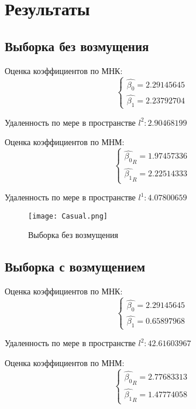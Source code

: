 \documentclass[12pt,a4paper]{article}
\begin{document}
\section {Результаты}
\subsection{Выборка без возмущения}
Оценка коэффициентов по МНК:
\begin{equation}
    \left\{
    \begin{array}{ll}
        \hat{\beta_0}=2.29145645\\
        \hat{\beta_1}=2.23792704
    \end{array}
    \right.
\end{equation}

Удаленность по мере в пространстве $l^2:2.90468199$

Оценка коэффициентов по МНМ:
\begin{equation}
    \left\{
    \begin{array}{ll}
        \hat{\beta_0}_R=1.97457336\\
        \hat{\beta_1}_R=2.22514333
    \end{array}
    \right.
\end{equation}

Удаленность по мере в пространстве $l^1:4.07800659$
\begin{figure}[H]
    \centering
    \texttt{[image: Casual.png]}
    \caption{Выборка без возмущения}
\end{figure}

\subsection{Выборка с возмущением}
Оценка коэффициентов по МНК:
\begin{equation}
    \left\{
    \begin{array}{ll}
        \hat{\beta_0}=2.29145645\\
        \hat{\beta_1}=0.65897968
    \end{array}
    \right.
\end{equation}

Удаленность по мере в пространстве $l^2:42.61603967$

Оценка коэффициентов по МНМ:
\begin{equation}
    \left\{
    \begin{array}{ll}
        \hat{\beta_0}_R=2.77683313\\
        \hat{\beta_1}_R=1.47774058
    \end{array}
    \right.
\end{equation}
\end{document}
